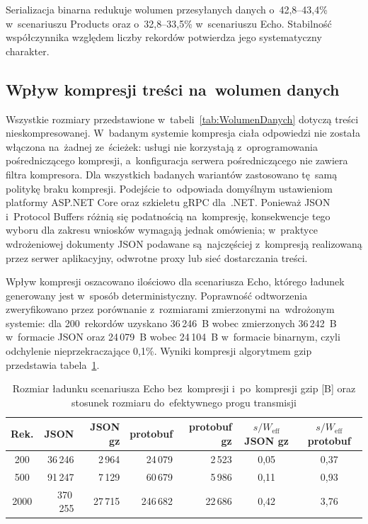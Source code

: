 Serializacja binarna redukuje wolumen przesyłanych danych o~42,8--43,4\% w~scenariuszu Products oraz o~32,8--33,5\% w~scenariuszu Echo. Stabilność współczynnika względem liczby rekordów potwierdza jego systematyczny charakter.

\subsection{Wpływ kompresji treści na~wolumen danych}
\label{subsec:Kompresja}

Wszystkie rozmiary przedstawione w~tabeli~\ref{tab:WolumenDanych} dotyczą treści nieskompresowanej. W~badanym systemie kompresja ciała odpowiedzi nie została włączona na~żadnej ze~ścieżek: usługi nie korzystają z~oprogramowania pośredniczącego kompresji, a~konfiguracja serwera pośredniczącego nie zawiera filtra kompresora. Dla wszystkich badanych wariantów zastosowano tę~samą politykę braku kompresji. Podejście to~odpowiada domyślnym ustawieniom platformy ASP.NET Core oraz szkieletu gRPC dla~.NET. Ponieważ JSON i~Protocol Buffers różnią się podatnością na~kompresję, konsekwencje tego wyboru dla zakresu wniosków wymagają jednak omówienia; w~praktyce wdrożeniowej dokumenty JSON podawane są~najczęściej z~kompresją realizowaną przez serwer aplikacyjny, odwrotne proxy lub sieć dostarczania treści.

Wpływ kompresji oszacowano ilościowo dla scenariusza Echo, którego ładunek generowany jest w~sposób deterministyczny. Poprawność odtworzenia zweryfikowano przez porównanie z~rozmiarami zmierzonymi na~wdrożonym systemie: dla 200~rekordów uzyskano 36\,246~B wobec zmierzonych 36\,242~B w~formacie JSON oraz 24\,079~B wobec 24\,104~B w~formacie binarnym, czyli odchylenie nieprzekraczające 0,1\%. Wyniki kompresji algorytmem gzip przedstawia tabela~\ref{tab:Kompresja}.

\begin{table}[htb]
\centering
\footnotesize
\caption{Rozmiar ładunku scenariusza Echo bez~kompresji i~po~kompresji gzip [B] oraz stosunek rozmiaru do~efektywnego progu transmisji}
\label{tab:Kompresja}
\begin{tabular}{|c|r|r|r|r|c|c|}
\hline
\textbf{Rek.} & \textbf{JSON} & \textbf{JSON gz} & \textbf{protobuf} & \textbf{protobuf gz} & \textbf{$s/W_{\mathrm{eff}}$ JSON gz} & \textbf{$s/W_{\mathrm{eff}}$ protobuf} \\
\hline
200  & 36\,246  & 2\,964  & 24\,079  & 2\,523  & 0,05 & 0,37 \\
500  & 91\,247  & 7\,129  & 60\,679  & 5\,986  & 0,11 & 0,93 \\
2000 & 370\,255 & 27\,715 & 246\,682 & 22\,686 & 0,42 & 3,76 \\
\hline
\end{tabular}
\end{table}

